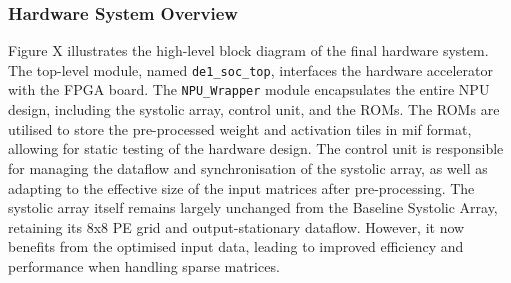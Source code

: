 \documentclass[12pt, a4paper, ukenglish]{article}
\begin{document}
    \subsubsection{Hardware System Overview}
    Figure X illustrates the high-level block diagram of the final hardware system. The top-level module, named \texttt{de1\_soc\_top}, interfaces the hardware accelerator with the FPGA board. The \texttt{NPU\_Wrapper} module encapsulates the entire NPU design, including the systolic array, control unit, and the ROMs. The ROMs are utilised to store the pre-processed weight and activation tiles in mif format, allowing for static testing of the hardware design. The control unit is responsible for managing the dataflow and synchronisation of the systolic array, as well as adapting to the effective size of the input matrices after pre-processing. The systolic array itself remains largely unchanged from the Baseline Systolic Array, retaining its 8x8 PE grid and output-stationary dataflow. However, it now benefits from the optimised input data, leading to improved efficiency and performance when handling sparse matrices.

            
\end{document}
